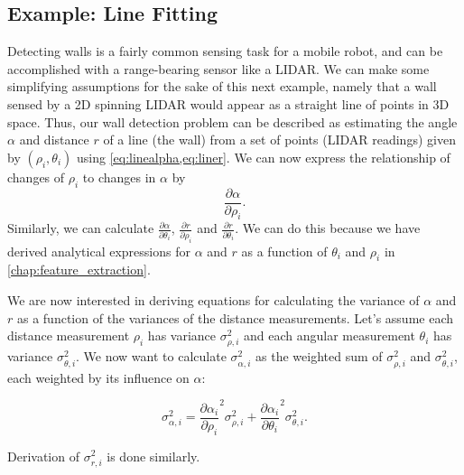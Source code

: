 \subsection{Example: Line Fitting}\label{sec:linefitting}
Detecting walls is a fairly common sensing task for a mobile robot, and can be accomplished with a range-bearing sensor like a  LIDAR. We can make some simplifying assumptions for the sake of this next example, namely that a wall sensed by a 2D spinning LIDAR would appear as a straight line of points in 3D space. Thus, our wall detection problem can be described as estimating the angle $\alpha$ and distance $r$ of a line (the wall) from a set of points (LIDAR readings) given by $(\rho_i,\theta_i)$ using \cref{eq:linealpha,eq:liner}. We can now express the relationship of changes of $ \rho_i$ to changes in $ \alpha$ by
\begin{equation}
\frac{\partial \alpha}{\partial \rho_i} .
\end{equation}
Similarly, we can calculate $ \frac{\partial \alpha}{\partial \theta_i}$, $ \frac{\partial r}{\partial \rho_i}$ and $ \frac{\partial r}{\partial \theta_i}$. We can do this because we have derived analytical expressions for $ \alpha$ and $ r$ as a function of $ \theta_i$ and $ \rho_i$ in \cref{chap:feature_extraction}.

We are now interested in deriving equations for calculating the variance of $ \alpha$ and $ r$ as a function of the variances of the distance measurements. Let's assume each distance measurement $ \rho_i$ has variance $ \sigma^2_{\rho,i}$ and each angular measurement $ \theta_i$ has variance $ \sigma^2_{\theta,i}$. We now want to calculate $ \sigma^2_{\alpha,i}$ as the weighted sum of  $ \sigma^2_{\rho,i}$ and $ \sigma^2_{\theta,i}$, each weighted by its influence on $ \alpha$:

\begin{equation}
    \sigma_{\alpha,i}^2 = \frac{\partial \alpha_i}{\partial \rho_i}^2 \sigma_{\rho,i}^2 + \frac{\partial \alpha_i}{\partial \theta_i}^2 \sigma_{\theta,i}^2 .
\end{equation} 

Derivation of $\sigma_{r,i}^2$ is done similarly.


